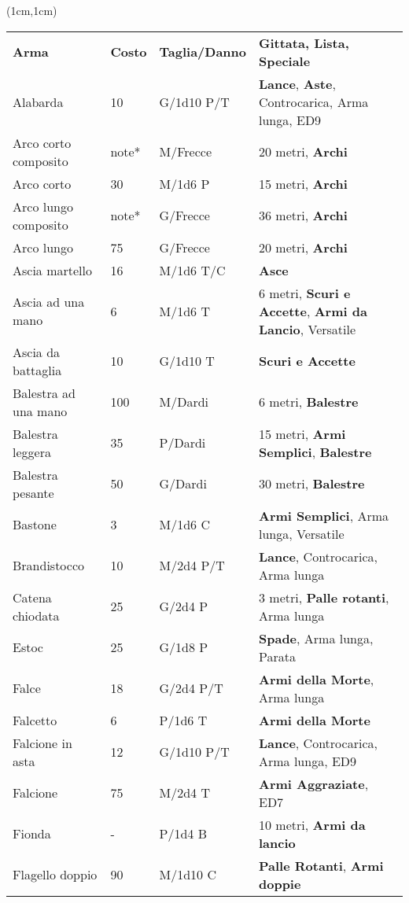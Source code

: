 \documentclass[a4paper,12 pt,openany]{book}
\begin{document}
\begin{textblock*}{19.5cm}(1cm,1cm) %

\begin{tabularx}{0.95\textwidth}{llll}
\textbf{Arma}&\textbf{Costo}&\textbf{Taglia/Danno} & \textbf{Gittata, Lista, Speciale}\\
Alabarda& 10 & G/1d10 P/T& \textbf{Lance}, \textbf{Aste}, Controcarica, Arma lunga, ED9 \\
Arco corto composito& note*& M/Frecce& 20 metri, \textbf{Archi}\\
Arco corto& 30 & M/1d6 P& 15 metri, \textbf{Archi}\\
Arco lungo composito& note*& G/Frecce& 36 metri, \textbf{Archi}\\
Arco lungo& 75 & G/Frecce& 20 metri, \textbf{Archi}\\
Ascia martello& 16 & M/1d6 T/C& \textbf{Asce}\\
Ascia ad una mano& 6 & M/1d6 T& 6 metri, \textbf{Scuri e Accette}, \textbf{Armi da Lancio}, Versatile\\
Ascia da battaglia& 10 & G/1d10 T&\textbf{Scuri e Accette}\\
Balestra ad una mano& 100& M/Dardi& 6 metri, \textbf{Balestre}\\
Balestra leggera& 35 & P/Dardi& 15 metri, \textbf{Armi Semplici}, \textbf{Balestre}\\
Balestra pesante& 50 & G/Dardi& 30 metri, \textbf{Balestre}\\
Bastone& 3& M/1d6 C& \textbf{Armi Semplici}, Arma lunga, Versatile\\
Brandistocco& 10 & M/2d4 P/T& \textbf{Lance}, Controcarica, Arma lunga\\
Catena chiodata& 25 & G/2d4 P& 3 metri, \textbf{Palle rotanti}, Arma lunga\\
Estoc& 25& G/1d8 P& \textbf{Spade}, Arma lunga, Parata\\
Falce& 18 & G/2d4 P/T& \textbf{Armi della Morte}, Arma lunga\\
Falcetto& 6& P/1d6 T& \textbf{Armi della Morte}\\
Falcione in asta& 12 & G/1d10 P/T& \textbf{Lance}, Controcarica, Arma lunga, ED9\\
Falcione& 75 & M/2d4 T& \textbf{Armi Aggraziate}, ED7\\
Fionda& -& P/1d4 B& 10 metri, \textbf{Armi da lancio}\\
Flagello doppio& 90 & M/1d10 C& \textbf{Palle Rotanti}, \textbf{Armi doppie}\\

\end{tabularx}
\end{textblock*}
\end{document}
